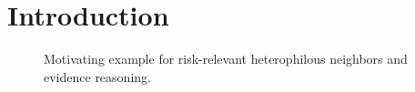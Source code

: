 \section{Introduction}


\begin{figure}[t]
  \centering
  \caption{Motivating example for risk-relevant heterophilous neighbors and evidence reasoning.}
  \label{fig:motivation}
\end{figure}
